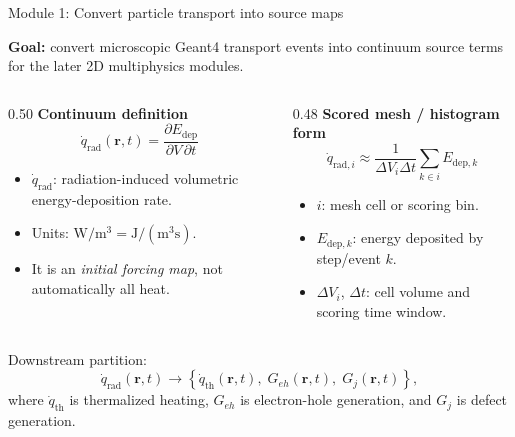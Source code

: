 \documentclass[aspectratio=169,10pt]{beamer}
\begin{document}
\begin{frame}{Module 1: Convert particle transport into source maps}
\small
\vspace{-2mm}
\begin{bluebox}
\centering\small
\textbf{Goal:} convert microscopic Geant4 transport events into continuum source terms for the later 2D multiphysics modules.
\end{bluebox}

\vspace{1mm}
\begin{columns}[T,totalwidth=\textwidth]
\begin{column}{0.50\textwidth}
\textbf{Continuum definition}
\begin{equation*}
\boxed{\dot{q}_{\mathrm{rad}}(\bm r,t)=\frac{\partial E_{\mathrm{dep}}}{\partial V\,\partial t}}
\end{equation*}
\small
\begin{itemize}\setlength\itemsep{0.5mm}
\item \(\dot{q}_{\mathrm{rad}}\): radiation-induced volumetric energy-deposition rate.
\item Units: \(\mathrm{W/m^3}=\mathrm{J/(m^3s)}\).
\item It is an \emph{initial forcing map}, not automatically all heat.
\end{itemize}
\end{column}

\begin{column}{0.48\textwidth}
\textbf{Scored mesh / histogram form}
\begin{equation*}
\boxed{\dot{q}_{\mathrm{rad},i}\approx
\frac{1}{\Delta V_i\Delta t}\sum_{k\in i}E_{\mathrm{dep},k}}
\end{equation*}
\small
\begin{itemize}\setlength\itemsep{0.5mm}
\item \(i\): mesh cell or scoring bin.
\item \(E_{\mathrm{dep},k}\): energy deposited by step/event \(k\).
\item \(\Delta V_i\), \(\Delta t\): cell volume and scoring time window.
\end{itemize}
\end{column}
\end{columns}

\vspace{1mm}
\begin{orangebox}
\centering\small
Downstream partition:
\[
\dot{q}_{\mathrm{rad}}(\bm r,t)\rightarrow
\left\{\dot{q}_{\mathrm{th}}(\bm r,t),\;G_{eh}(\bm r,t),\;G_j(\bm r,t)\right\},
\]
where \(\dot{q}_{\mathrm{th}}\) is thermalized heating, \(G_{eh}\) is electron-hole generation, and \(G_j\) is defect generation.
\end{orangebox}
\end{frame}
\end{document}
